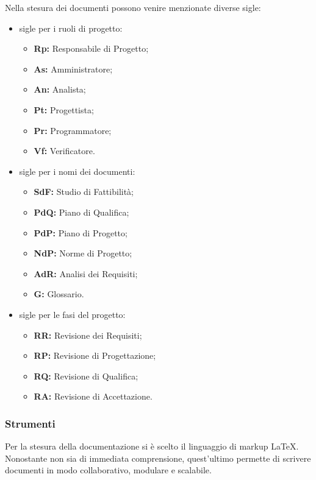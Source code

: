         Nella stesura dei documenti possono venire menzionate diverse sigle:
        \begin{itemize}
          \item sigle per i ruoli di progetto:
            \begin{itemize}
              \item \textbf{Rp:} Responsabile di Progetto;
              \item \textbf{As:} Amministratore;
              \item \textbf{An:} Analista;
              \item \textbf{Pt:} Progettista;
              \item \textbf{Pr:} Programmatore;
              \item \textbf{Vf:} Verificatore.
            \end{itemize}
          \item sigle per i nomi dei documenti:
            \begin{itemize}
              \item \textbf{SdF:} Studio di Fattibilità;
              \item \textbf{PdQ:} Piano di Qualifica;
              \item \textbf{PdP:} Piano di Progetto;
              \item \textbf{NdP:} Norme di Progetto;
              \item \textbf{AdR:} Analisi dei Requisiti;
              \item \textbf{G:} Glossario.
            \end{itemize}
          \item sigle per le fasi del progetto:
            \begin{itemize}
              \item \textbf{RR:} Revisione dei Requisiti;
              \item \textbf{RP:} Revisione di Progettazione;
              \item \textbf{RQ:} Revisione di Qualifica;
              \item \textbf{RA:} Revisione di Accettazione.
            \end{itemize}
        \end{itemize}

    \subsubsection{Strumenti}
      \subsubsubsection{\LaTeX}
        Per la stesura della documentazione si è scelto il linguaggio di markup \LaTeX{}. Nonostante non sia di immediata comprensione, quest'ultimo permette di scrivere documenti in modo collaborativo, modulare e scalabile.

